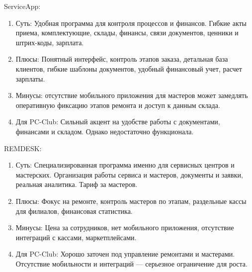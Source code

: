 ServiceApp:
\begin{enumerate}
	\item Суть: Удобная программа для контроля процессов и финансов. Гибкие акты приема, комплектующие, склады, финансы, связи документов, ценники и штрих-коды, зарплата.
	\item Плюсы: Понятный интерфейс, контроль этапов заказа, детальная база клиентов, гибкие шаблоны документов, удобный финансовый учет, расчет зарплаты.
	\item Минусы: отсутствие мобильного приложения для мастеров может замедлять оперативную фиксацию этапов ремонта и доступ к данным склада.
	\item Для PC-Club: Сильный акцент на удобстве работы с документами, финансами и складом. Однако недостаточно функционала. 
\end{enumerate}

REMDESK:
\begin{enumerate}
	\item Суть: Специализированная программа именно для сервисных центров и мастерских. Организация работы сервиса и мастеров, документы и заявки, реальная аналитика. Тариф за мастеров.
	\item Плюсы: Фокус на ремонте, контроль мастеров по этапам, раздельные кассы для филиалов, финансовая статистика.
	\item Минусы: Цена за сотрудников, нет мобильного приложения, отсутствие интеграций с кассами, маркетплейсами.
	\item Для PC-Club: Хорошо заточен под управление ремонтами и мастерами. Отсутствие мобильности и интеграций — серьезное ограничение для роста.
\end{enumerate}









